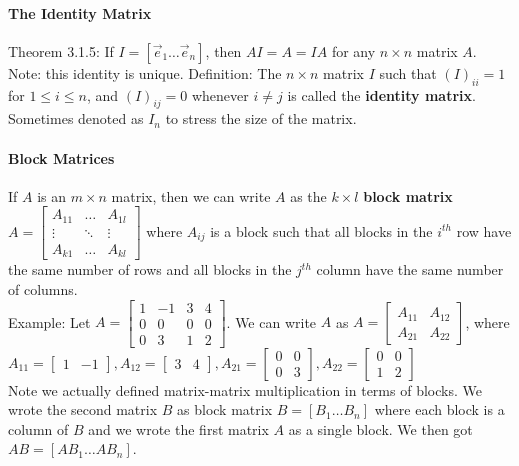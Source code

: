 \documentclass[10pt,letter]{article}
\begin{document}
\paragraph{The Identity Matrix} Theorem 3.1.5: If $I=[\vec{e}_1\ldots\vec{e}_n]$, then $AI=A=IA$ for any $n\times n$ matrix $A$. Note: this identity is unique. Definition: The $n\times n$ matrix $I$ such that $(I)_{ii}=1$ for $1\leq i\leq n$, and $(I)_{ij}=0$ whenever $i\neq j$ is called the \textbf{identity matrix}. Sometimes denoted as $I_n$ to stress the size of the matrix. 

\paragraph{Block Matrices} If $A$ is an $m\times n$ matrix, then we can write $A$ as the $k\times l$ \textbf{block matrix} $A = \begin{bmatrix}A_{11}&\ldots&A_{1l}\\\vdots&\ddots&\vdots\\A_{k1}&\ldots&A_{kl}\end{bmatrix}$ where $A_{ij}$ is a block such that all blocks in the $i^{th}$ row have the same number of rows and all blocks in the $j^{th}$ column have the same number of columns. \\ 
Example: Let $A = \begin{bmatrix}1&-1&3&4\\0&0&0&0\\0&3&1&2\end{bmatrix}$. We can write $A$ as $A = \begin{bmatrix}A_{11}&A_{12}\\A_{21}&A_{22}\end{bmatrix}$, where $A_{11}=\begin{bmatrix}1&-1\end{bmatrix}, A_{12}=\begin{bmatrix}3&4\end{bmatrix},A_{21}=\begin{bmatrix}0&0\\0&3\end{bmatrix},A_{22}=\begin{bmatrix}0&0\\1&2\end{bmatrix}$\\ 
Note we actually defined matrix-matrix multiplication in terms of blocks. We wrote the second matrix $B$ as block matrix $B=[B_1\ldots B_n]$ where each block is a column of $B$ and we wrote the first matrix $A$ as a single block. We then got $AB=[AB_1\ldots AB_n]$. \\ 
\end{document}
